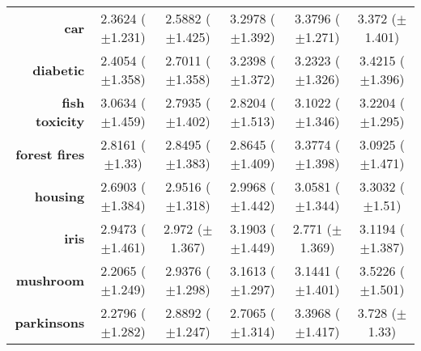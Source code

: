\begin{table}[htbp]
{\begin{tabular}{r|ccccc}
			\textbf{car}                 & \cellcolor[rgb]{ .388,  .745,  .482}2.3624 ($\pm$1.231) & \cellcolor[rgb]{ .533,  .784,  .49}2.5882 ($\pm$1.425)  & \cellcolor[rgb]{ 1,  .922,  .518}3.2978 ($\pm$1.392)    & \cellcolor[rgb]{ .973,  .412,  .42}3.3796 ($\pm$1.271)  & \cellcolor[rgb]{ .976,  .459,  .431}3.372 ($\pm$1.401)  \\
			\textbf{diabetic}            & \cellcolor[rgb]{ .388,  .745,  .482}2.4054 ($\pm$1.358) & \cellcolor[rgb]{ .604,  .808,  .494}2.7011 ($\pm$1.358) & \cellcolor[rgb]{ 1,  .902,  .518}3.2398 ($\pm$1.372)    & \cellcolor[rgb]{ 1,  .922,  .518}3.2323 ($\pm$1.326)    & \cellcolor[rgb]{ .973,  .412,  .42}3.4215 ($\pm$1.396)  \\
			\textbf{fish toxicity}       & \cellcolor[rgb]{ 1,  .922,  .518}3.0634 ($\pm$1.459)    & \cellcolor[rgb]{ .388,  .745,  .482}2.7935 ($\pm$1.402) & \cellcolor[rgb]{ .447,  .761,  .482}2.8204 ($\pm$1.513) & \cellcolor[rgb]{ .996,  .796,  .494}3.1022 ($\pm$1.346) & \cellcolor[rgb]{ .973,  .412,  .42}3.2204 ($\pm$1.295)  \\
			\textbf{forest fires}        & \cellcolor[rgb]{ .388,  .745,  .482}2.8161 ($\pm$1.33)  & \cellcolor[rgb]{ .808,  .867,  .506}2.8495 ($\pm$1.383) & \cellcolor[rgb]{ 1,  .922,  .518}2.8645 ($\pm$1.409)    & \cellcolor[rgb]{ .973,  .412,  .42}3.3774 ($\pm$1.398)  & \cellcolor[rgb]{ .988,  .698,  .475}3.0925 ($\pm$1.471) \\
			\textbf{housing}             & \cellcolor[rgb]{ .388,  .745,  .482}2.6903 ($\pm$1.384) & \cellcolor[rgb]{ .91,  .894,  .51}2.9516 ($\pm$1.318)   & \cellcolor[rgb]{ 1,  .922,  .518}2.9968 ($\pm$1.442)    & \cellcolor[rgb]{ .996,  .82,  .498}3.0581 ($\pm$1.344)  & \cellcolor[rgb]{ .973,  .412,  .42}3.3032 ($\pm$1.51)   \\
			\textbf{iris}                & \cellcolor[rgb]{ .922,  .898,  .51}2.9473 ($\pm$1.461)  & \cellcolor[rgb]{ 1,  .922,  .518}2.972 ($\pm$1.367)     & \cellcolor[rgb]{ .973,  .412,  .42}3.1903 ($\pm$1.449)  & \cellcolor[rgb]{ .388,  .745,  .482}2.771 ($\pm$1.369)  & \cellcolor[rgb]{ .984,  .58,  .455}3.1194 ($\pm$1.387)  \\
			\textbf{mushroom}            & \cellcolor[rgb]{ .388,  .745,  .482}2.2065 ($\pm$1.249) & \cellcolor[rgb]{ .863,  .882,  .51}2.9376 ($\pm$1.298)  & \cellcolor[rgb]{ 1,  .902,  .514}3.1613 ($\pm$1.297)    & \cellcolor[rgb]{ 1,  .922,  .518}3.1441 ($\pm$1.401)    & \cellcolor[rgb]{ .973,  .412,  .42}3.5226 ($\pm$1.501)  \\
			\textbf{parkinsons}          & \cellcolor[rgb]{ .388,  .745,  .482}2.2796 ($\pm$1.282) & \cellcolor[rgb]{ 1,  .922,  .518}2.8892 ($\pm$1.247)    & \cellcolor[rgb]{ .816,  .867,  .506}2.7065 ($\pm$1.314) & \cellcolor[rgb]{ .984,  .616,  .459}3.3968 ($\pm$1.417) & \cellcolor[rgb]{ .973,  .412,  .42}3.728 ($\pm$1.33)    \\

\end{tabular}}
\end{table}
